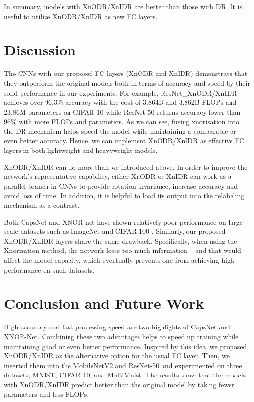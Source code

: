 \documentclass[sn-mathphys,iicol,Numbered]{sn-jnl}
\begin{document}
In summary, models with XnODR/XnIDR are better than those with DR. It is useful to utilize XnODR/XnIDR as new FC layers.

\section{Discussion} \label{sec:5}

The CNNs with our proposed FC layers (XnODR and XnIDR) demonstrate that they outperform the original models both in terms of accuracy and speed by their solid performance in our experiments. For example, ResNet\_XnODR/XnIDR achieves over 96.3\% accuracy with the cost of 3.864B and 3.862B FLOPs and 23.86M parameters on CIFAR-10 while ResNet-50 returns accuracy lower than 96\% with more FLOPs and parameters. As we can see, fusing xnorization into the DR mechanism helps speed the model while maintaining a comparable or even better accuracy. Hence, we can implement XnODR/XnIDR as effective FC layers in both lightweight and heavyweight models. 

XnODR/XnIDR can do more than we introduced above. In order to improve the network's representative capability, either XnODR or XnIDR can work as a parallel branch in CNNs to provide rotation invariance, increase accuracy and avoid loss of time. In addition, it is helpful to load its output into the relabeling mechanism as a contrast.

Both CapsNet and XNOR-net have shown relatively poor performance on large-scale datasets such as ImageNet and CIFAR-100 \cite{A66_CapsNet_CIFAR100}. Similarly, our proposed XnODR/XnIDR layers share the same drawback. Specifically, when using the Xnorization method, the network loses too much information ~\citep{A2_xnor, A17_Xnor-Prune} and that would affect the model capacity, which eventually prevents one from achieving high performance on such datasets.

\section{Conclusion and Future Work} \label{sec:6}

High accuracy and fast processing speed are two highlights of CapsNet and XNOR-Net. Combining these two advantages helps to speed up training while maintaining good or even better performance. Inspired by this idea, we proposed XnODR/XnIDR as the alternative option for the usual FC layer. Then, we inserted them into the MobileNetV2 and ResNet-50 and experimented on three datasets, MNIST, CIFAR-10, and MultiMnist. The results show that the models with XnODR/XnIDR predict better than the original model by taking fewer parameters and less FLOPs. 
\end{document}
